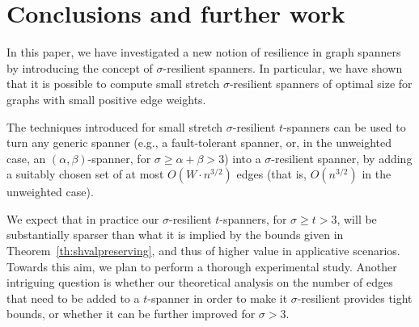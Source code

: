\documentclass{article}
\begin{document}
\section{Conclusions and further work}\label{se_conclusions}

In this paper, we have investigated a new notion of resilience in graph spanners by introducing the concept of $\sigma$-resilient spanners. In particular, we have shown that it is possible to compute small stretch $\sigma$-resilient spanners of optimal size for graphs with small positive edge weights.

The techniques introduced for small stretch $\sigma$-resilient $t$-spanners can be used to turn any generic spanner (e.g., a fault-tolerant spanner, or, in the unweighted case, an $(\alpha,\beta)$-spanner, for $\sigma\geq \alpha+\beta > 3$) into a $\sigma$-resilient spanner, by adding a suitably chosen set of at most $O(W \cdot n^{3/2})$ edges (that is, $O(n^{3/2})$ in the unweighted case). 

We expect that in practice  
our $\sigma$-resilient $t$-spanners, for $\sigma \geq t >3$, will be substantially sparser than what it is implied by the bounds given in Theorem~\ref{th:shvalpreserving}, and thus of higher value in applicative scenarios. Towards this aim, we plan to perform a thorough experimental study.
Another intriguing question is whether our theoretical analysis on the number of edges that need to be added to a $t$-spanner in order to make it $\sigma$-resilient provides tight bounds, or whether it can be further improved for $\sigma > 3$. 



\end{document}
